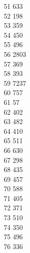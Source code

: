 { 51	633 \\
 52	198 \\
 53	359 \\
 54	450 \\
 55	496 \\
 56	2803 \\
 57	369 \\
 58	393 \\
 59	7237 \\
 60	757 \\
 61	57 \\
 62	402 \\
 63	482 \\
 64	410 \\
 65	511 \\
 66	630 \\
 67	298 \\
 68	435 \\
 69	457 \\
 70	588 \\
 71	405 \\
 72	371 \\
 73	510 \\
 74	350 \\
 75	496 \\
 76	336 \\
}

